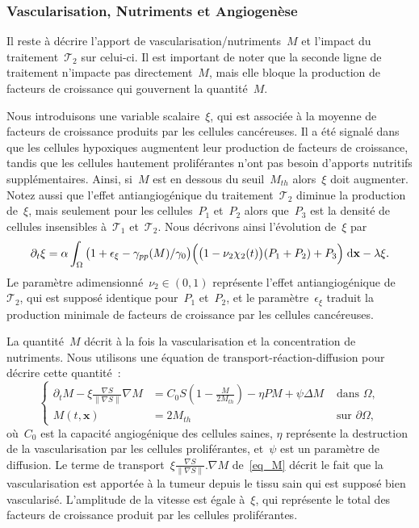 \documentclass[11pt]{amsart}
\numberwithin{equation}{section}
\newcommand{\TI}{{\mathcal T_1}}
\newcommand{\TS}{{\mathcal T_2}}
\newcommand{\chiS}{\chi_2}
\newcommand{\nuS}{\nu_2}
\newcommand{\gammapp}{\gamma_{pp}}
\newcommand{\Ms}{M_{th}}
\newcommand{\vecx}{\mathbf{x}}
\begin{document}
\subsubsection{Vascularisation, Nutriments et Angiogenèse}
Il reste à décrire l'apport de vascularisation/nutriments~$M$ 
et l'impact du traitement~$\TS$ sur celui-ci. Il est important de noter que la seconde ligne de traitement n'impacte pas directement~$M$, mais elle bloque la production de facteurs de croissance qui gouvernent la quantité~$M$.

Nous introduisons une variable scalaire~$\xi$, qui est associée à la moyenne de facteurs de croissance produits par les cellules cancéreuses. 
Il a été signalé dans~\cite{Holmes2007} que les cellules hypoxiques augmentent leur production de facteurs de croissance, tandis que les cellules hautement proliférantes n'ont pas besoin d'apports nutritifs supplémentaires. Ainsi, si~$M$ est en dessous du seuil~$\Ms$ alors~$\xi$ doit augmenter. 
Notez aussi que l'effet antiangiogénique du 
traitement~$\TS$ diminue la production
de~$\xi$, mais seulement pour les cellules~$P_1$ et~$P_2$ alors que~$P_3$ est la densité de cellules insensibles à~$\TI$ et~$\TS$. 
Nous décrivons ainsi l'évolution de~$\xi$ par
\begin{equation}\label{eq_xi}
\partial_t \xi = \alpha \int_\Omega \big(1+\epsilon_{\xi} - \gammapp(M) / \gamma_0 \big)\Big(\big(1-\nuS\chiS(t)\big)(P_1+P_2)+P_3\Big) \textrm{\;d}\vecx - \lambda \xi.
\end{equation}
Le paramètre adimensionné~$\nuS\in(0,1)$ représente l'effet antiangiogénique de~$\TS$, qui est supposé identique pour~$P_1$ et~$P_2$, et le paramètre~$\epsilon_{\xi}$ traduit la production minimale de facteurs de croissance par les cellules cancéreuses.


La quantité~$M$ décrit à la fois la vascularisation et la concentration de nutriments. Nous utilisons une équation de transport-réaction-diffusion pour décrire cette quantité~:
\begin{equation}\label{eq_M}
\left\{
\begin{aligned}
\partial_t M - \xi \frac{\nabla S}{\| \nabla S \|}\nabla M &= C_0 S
\left(1-\frac{M}{2\Ms}\right) - \eta PM +\psi \Delta M & \textrm{ dans } \Omega, \\
M(t,\vecx)&= 2\Ms & \textrm{ sur } \partial \Omega,
\end{aligned}
\right.
\end{equation}
où~$C_0$ est la capacité angiogénique des cellules saines, 
$\eta$ représente la destruction de la vascularisation par les cellules proliférantes, et~$\psi$ est un paramètre de diffusion.  
Le terme de transport~$\xi \frac{\nabla S}{\| \nabla S \|}. \nabla M$ de~\eqref{eq_M} décrit le fait que la vascularisation est apportée à la tumeur depuis le tissu sain qui est supposé bien vascularisé.  L'amplitude de la vitesse est égale à~$\xi$, qui représente le total des facteurs de croissance produit par les cellules proliférantes.
\end{document}
